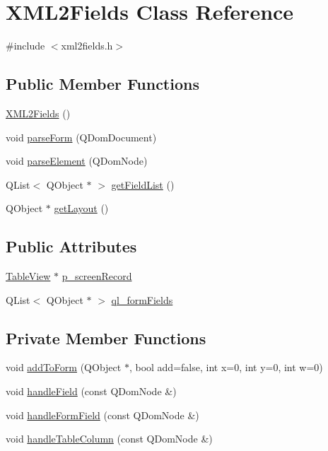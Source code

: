 \hypertarget{classXML2Fields}{
\section{XML2Fields Class Reference}
\label{classXML2Fields}
}


{\ttfamily \#include $<$xml2fields.h$>$}

\subsection*{Public Member Functions}
\begin{DoxyCompactItemize}
\item 
\hyperlink{classXML2Fields_ab137f257e4b4a24c22c19e02187bf244}{XML2Fields} ()
\item 
void \hyperlink{classXML2Fields_a8167567a765a2b695b505bc5ac757ac7}{parseForm} (QDomDocument)
\item 
void \hyperlink{classXML2Fields_aa58a06287e0c221b5447fdd04be6cfa5}{parseElement} (QDomNode)
\item 
QList$<$ QObject $\ast$ $>$ \hyperlink{classXML2Fields_a2f9ef3fc4ee382767b0a3828644183ed}{getFieldList} ()
\item 
QObject $\ast$ \hyperlink{classXML2Fields_ae9c6004fc3c4f7129447112eb85fdf09}{getLayout} ()
\end{DoxyCompactItemize}
\subsection*{Public Attributes}
\begin{DoxyCompactItemize}
\item 
\hyperlink{classTableView}{TableView} $\ast$ \hyperlink{classXML2Fields_a520c208c5d9f130f7e534443ec045297}{p\_\-screenRecord}
\item 
QList$<$ QObject $\ast$ $>$ \hyperlink{classXML2Fields_ae92aef70643deee1737b7fc0096735f6}{ql\_\-formFields}
\end{DoxyCompactItemize}
\subsection*{Private Member Functions}
\begin{DoxyCompactItemize}
\item 
void \hyperlink{classXML2Fields_a0c3fb22790512de12888f93d89d6921e}{addToForm} (QObject $\ast$, bool add=false, int x=0, int y=0, int w=0)
\item 
void \hyperlink{classXML2Fields_ad8d3383e6a6db84e1499a8f42055744d}{handleField} (const QDomNode \&)
\item 
void \hyperlink{classXML2Fields_a703cfa98e9f508904bf619bee44b5ced}{handleFormField} (const QDomNode \&)
\item 
void \hyperlink{classXML2Fields_a4f91d9cc5b3cdc353534a8c06e3ef4f9}{handleTableColumn} (const QDomNode \&)
\end{DoxyCompactItemize}
